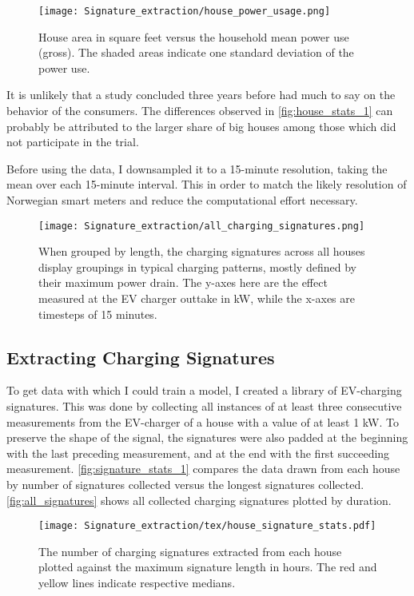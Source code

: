 \documentclass[12pt, american]{report}
\begin{document}
\begin{figure}[h]
\centering
\caption{House area in square feet versus the household mean power use (gross). The shaded areas indicate one standard deviation of the power use. }
\label{fig:house_stats_1}
\texttt{[image: Signature\_extraction/house\_power\_usage.png]}
\end{figure}


It is unlikely that a study concluded three years before had much to say on the behavior of the consumers. The differences observed in \autoref{fig:house_stats_1} can probably be attributed to the larger share of big houses among those which did not participate in the trial.

Before using the data, I downsampled it to a 15-minute resolution, taking the mean over each 15-minute interval. This in order to match the likely resolution of Norwegian smart meters and reduce the computational effort necessary.

\newpage

\begin{figure}[h]
\caption{When grouped by length, the charging signatures across all houses display groupings in typical charging patterns, mostly defined by their maximum power drain. The y-axes here are the effect measured at the EV charger outtake in kW, while the x-axes are timesteps of 15 minutes.}
\label{fig:all_signatures}
\texttt{[image: Signature\_extraction/all\_charging\_signatures.png]}
\end{figure}

\clearpage


\subsection{Extracting Charging Signatures}

To get data with which I could train a model, I created a library of EV-charging signatures. This was done by collecting all instances of at least three consecutive measurements from the EV-charger of a house with a value of at least 1 kW. To preserve the shape of the signal, the signatures were also padded at the beginning with the last preceding measurement, and at the end with the first succeeding measurement. \autoref{fig:signature_stats_1} compares the data drawn from each house by number of signatures collected versus the longest signatures collected. \autoref{fig:all_signatures} shows all collected charging signatures plotted by duration.

\begin{figure}
\centering
\def\svgwidth{\columnwidth}
\caption{The number of charging signatures extracted from each house plotted against the maximum signature length in hours. The red and yellow lines indicate respective medians.}
\texttt{[image: Signature\_extraction/tex/house\_signature\_stats.pdf]}
\label{fig:signature_stats_1}
\end{figure}
\end{document}
